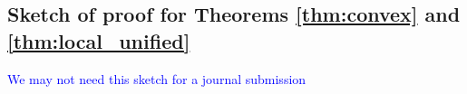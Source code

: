 \documentclass[11pt]{amsart}
\theoremstyle{plain}
\theoremstyle{definition}
\theoremstyle{remark}
\newcommand{\commHL}[1]{{\textcolor{blue}{#1}}}
\begin{document}




\iffalse
\subsection{Sketch of proof for Theorems \ref{thm:convex} and \ref{thm:local_unified}}

\commHL{We may not need this sketch for a journal submission}
\end{document}

